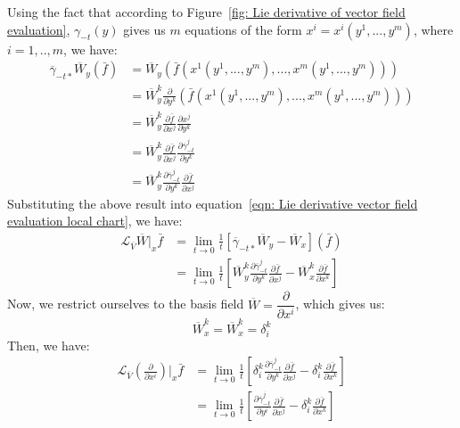         Using the fact that according to Figure~\ref{fig: Lie derivative of
        vector field evaluation}, $\gamma_{-t}(y)$ gives us $m$ equations of
        the form $x^i = x^i(y^1,...,y^m)$, where $i = 1,..,m$, we have:
        \begin{align*}
          \overline{\gamma}_{-t*}\overline{W}_y\left(\bar{f}\right) 
          &=
          \overline{W}_y\left(\bar{f}(x^1(y^1,...,y^m),...,x^m(y^1,...,y^m))\right)
          \\
          &=
          \overline{W}^k_y\frac{\partial}{\partial
          y^k}\left(\bar{f}(x^1(y^1,...,y^m),...,x^m(y^1,...,y^m))\right) \\
          &=\overline{W}^k_y\frac{\partial \bar{f}}{\partial
          x^j}\frac{\partial x^j}{\partial y^k}\\
          &= \overline{W}^k_y\frac{\partial \bar{f}}{\partial
          x^j}\frac{\partial \overline{\gamma}_{-t}^j}{\partial y^k} \\
          &= \overline{W}^k_y\frac{\partial
          \overline{\gamma}_{-t}^j}{\partial y^k}\frac{\partial
          \bar{f}}{\partial x^j}
        \end{align*}
        Substituting the above result into equation~\ref{eqn: Lie
        derivative vector field evaluation local chart}, we have:
        \begin{align*}
          \mathcal{L}_{\overline{V}}\overline{W}\Bigr|_x \bar{f}
          &= \lim_{t \to
          0}\frac{1}{t}\left[\overline{\gamma}_{-t*}\overline{W}_y -
          \overline{W}_x \right]\left(\bar{f}\right) \\
          &= \lim_{t \to
          0}\frac{1}{t}\left[ \overline{W}^k_y\frac{\partial
          \overline{\gamma}_{-t}^j}{\partial y^k}\frac{\partial
          \bar{f}}{\partial x^j} -
          \overline{W}^k_x\frac{\partial \bar{f}}{\partial x^k} \right]
        \end{align*}
        Now, we restrict ourselves to the basis field $\overline{W} =
        \dfrac{\partial}{\partial x^i}$, which gives us:
        \[\overline{W}_x^k =\overline{W}_x^k = \delta^k_i \]
        Then, we have:
        \begin{align*}
          \mathcal{L}_{\overline{V}}\left(\frac{\partial}{\partial
          x^i}\right)\Bigr|_x \bar{f}
          &= \lim_{t \to 0}\frac{1}{t}\left[ \delta^k_i \frac{\partial
          \overline{\gamma}_{-t}^j}{\partial y^k}\frac{\partial
          \bar{f}}{\partial x^j} - \delta^k_i\frac{\partial \bar{f}}{\partial
          x^k} \right] \\
          &= \lim_{t \to 0}\frac{1}{t}\left[\frac{\partial
          \overline{\gamma}_{-t}^j}{\partial y^i}\frac{\partial
          \bar{f}}{\partial x^j} - \delta^k_i\frac{\partial \bar{f}}{\partial
          x^k} \right]
        \end{align*}

